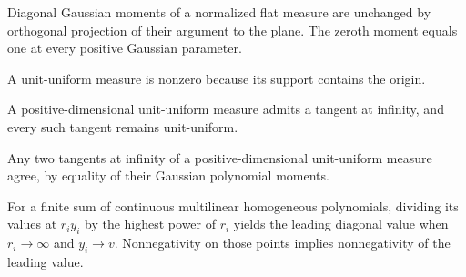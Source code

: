 \begin{lemma}
\label{lem:flat-moment-projection}

Diagonal Gaussian moments of a normalized flat measure are unchanged by orthogonal projection of their argument to the plane. The zeroth moment equals one at every positive Gaussian parameter.
\end{lemma}

\begin{lemma}
\label{lem:unit-uniform-nonzero}

A unit-uniform measure is nonzero because its support contains the origin.
\end{lemma}

\begin{lemma}
\label{lem:unit-uniform-infinity-existence}

A positive-dimensional unit-uniform measure admits a tangent at infinity, and every such tangent remains unit-uniform.
\end{lemma}

\begin{lemma}
\label{lem:unit-uniform-infinity-unique}

Any two tangents at infinity of a positive-dimensional unit-uniform measure agree, by equality of their Gaussian polynomial moments.
\end{lemma}

\begin{lemma}
\label{lem:leading-homogeneous-term}

For a finite sum of continuous multilinear homogeneous polynomials, dividing its values at $r_i y_i$ by the highest power of $r_i$ yields the leading diagonal value when $r_i\to\infty$ and $y_i\to v$. Nonnegativity on those points implies nonnegativity of the leading value.
\end{lemma}

